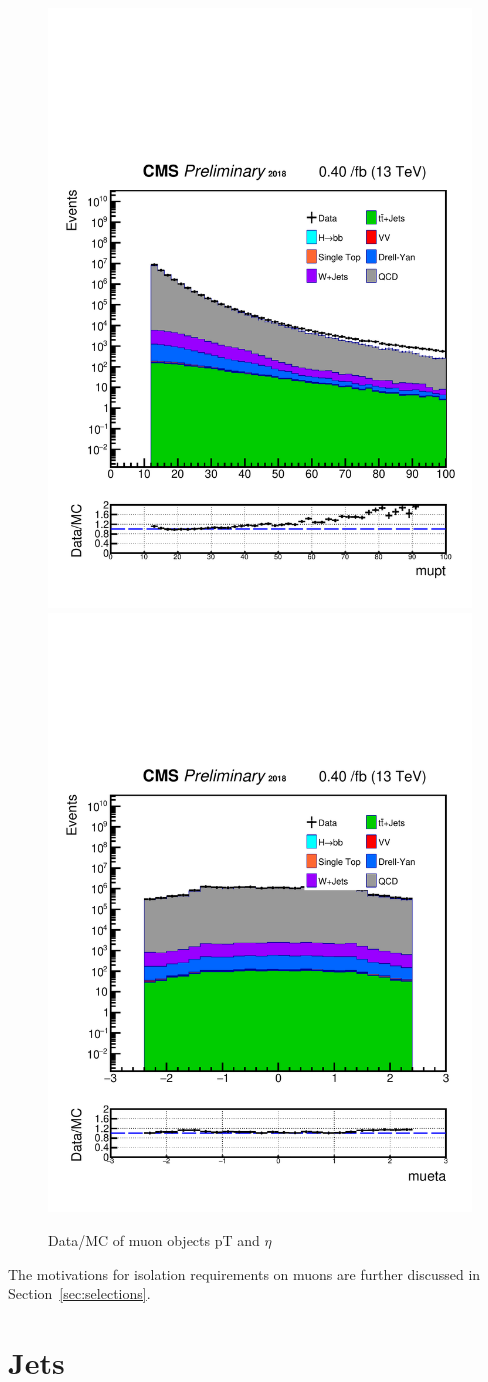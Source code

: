 \begin{figure}[h!]
  \caption{Data/MC of muon objects pT and $\eta$}
  \label{fig:muons}
  \centering
  \includegraphics[width=0.47\linewidth]{figs/Data_AnalysisNoteplot_MS-15_ctauS-10_mupt.pdf}
  \includegraphics[width=0.47\linewidth]{figs/Data_AnalysisNoteplot_MS-15_ctauS-10_mueta.pdf}
\end{figure}

The motivations for isolation requirements on muons are further discussed in Section~\ref{sec:selections}.


\section{Jets}\label{sec:jets}

